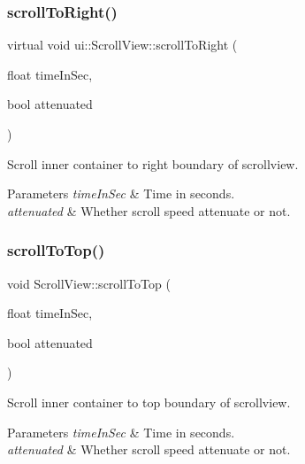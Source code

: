 \subsubsection{\texorpdfstring{scroll\+To\+Right()}{scrollToRight()}\hspace{0.1cm}{\footnotesize\ttfamily [2/2]}}
{\footnotesize\ttfamily virtual void ui\+::\+Scroll\+View\+::scroll\+To\+Right (\begin{DoxyParamCaption}\item[{float}]{time\+In\+Sec,  }\item[{bool}]{attenuated }\end{DoxyParamCaption})\hspace{0.3cm}{\ttfamily [virtual]}}

Scroll inner container to right boundary of scrollview. 
\begin{DoxyParams}{Parameters}
{\em time\+In\+Sec} & Time in seconds. \\
\hline
{\em attenuated} & Whether scroll speed attenuate or not. \\
\hline
\end{DoxyParams}
\mbox{\label{classui_1_1ScrollView_ae4f80c33a24a47a06b336bf19c4d0f4f}} 
\subsubsection{\texorpdfstring{scroll\+To\+Top()}{scrollToTop()}\hspace{0.1cm}{\footnotesize\ttfamily [1/2]}}
{\footnotesize\ttfamily void Scroll\+View\+::scroll\+To\+Top (\begin{DoxyParamCaption}\item[{float}]{time\+In\+Sec,  }\item[{bool}]{attenuated }\end{DoxyParamCaption})\hspace{0.3cm}{\ttfamily [virtual]}}

Scroll inner container to top boundary of scrollview. 
\begin{DoxyParams}{Parameters}
{\em time\+In\+Sec} & Time in seconds. \\
\hline
{\em attenuated} & Whether scroll speed attenuate or not. \\
\hline
\end{DoxyParams}
\mbox{\label{classui_1_1ScrollView_a36729cef821e9eb864bfd3e48a279218}} 
